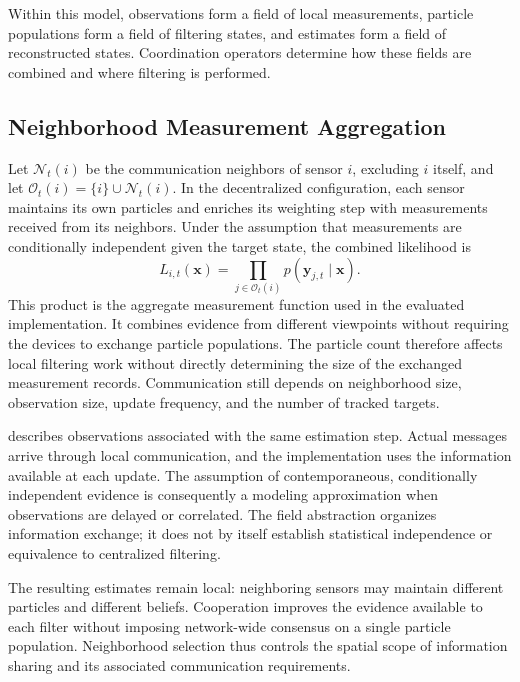 Within this model, 
 observations form a field of local measurements, 
 particle populations form a field of filtering states, 
 and estimates form a field of reconstructed states.
%
Coordination operators determine how these fields are combined 
 and where filtering is performed.

\subsection{Neighborhood Measurement Aggregation}
\label{subsec:dpf-neighborhood}

Let $\mathcal{N}_t(i)$ be the communication neighbors of sensor $i$,
 excluding $i$ itself, 
 and let $\mathcal{O}_t(i)=\{i\}\cup\mathcal{N}_t(i)$.
%
In the decentralized configuration, 
 each sensor maintains its own particles and enriches its weighting step 
 with measurements received from its neighbors.
%
Under the assumption that measurements are conditionally independent given the target state,
 the combined likelihood is
\begin{equation}
    L_{i,t}(\mathbf{x})
    = \prod_{j\in\mathcal{O}_t(i)}
      p(\mathbf{y}_{j,t}\mid\mathbf{x}).
    \label{eq:dpf-neighborhood-likelihood}
\end{equation}
%
This product is the aggregate measurement function 
 used in the evaluated implementation.
%
It combines evidence from different viewpoints without requiring the devices 
 to exchange particle populations.
%
The particle count therefore affects local filtering work without directly determining 
 the size of the exchanged measurement records.
%
Communication still depends on neighborhood size, observation size, update frequency, 
 and the number of tracked targets.

 describes observations associated 
 with the same estimation step.
%
Actual messages arrive through local communication, 
 and the implementation uses the information available at each update.
%
The assumption of contemporaneous, 
 conditionally independent evidence is consequently a modeling approximation 
 when observations are delayed or correlated.
%
The field abstraction organizes information exchange; 
 it does not by itself establish statistical independence or equivalence 
 to centralized filtering.

The resulting estimates remain local: 
 neighboring sensors may maintain different particles and different beliefs.
%
Cooperation improves the evidence available to each filter 
 without imposing network-wide consensus on a single particle population.
%
Neighborhood selection thus controls the spatial scope of information sharing 
 and its associated communication requirements.

